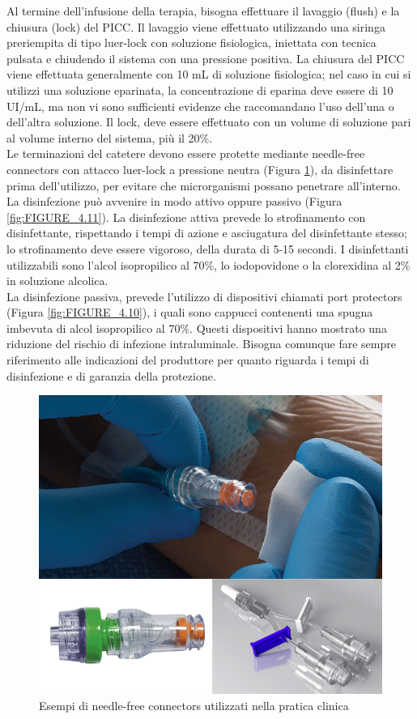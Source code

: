Al termine dell’infusione della terapia, bisogna effettuare il lavaggio (flush) e la chiusura (lock) del PICC.
Il lavaggio viene effettuato utilizzando una siringa preriempita di tipo luer-lock con soluzione fisiologica, 
iniettata con tecnica pulsata e chiudendo il sistema con una pressione positiva. La chiusura del PICC viene effettuata 
generalmente con 10 mL di soluzione fisiologica; nel caso in cui si utilizzi una soluzione eparinata, la 
concentrazione di eparina deve essere di 10 UI/mL, ma non vi sono sufficienti evidenze che raccomandano l’uso 
dell’una o dell’altra soluzione. 
Il lock, deve essere effettuato con un volume di soluzione pari al volume interno del sistema, più il 20\%.\\
Le terminazioni del catetere devono essere protette mediante needle-free connectors con attacco luer-lock a pressione 
neutra (Figura \ref{fig:FIGURE_4.9}), da disinfettare prima dell’utilizzo, per evitare che microrganismi possano penetrare 
all’interno. La disinfezione può avvenire in modo attivo oppure passivo (Figura \ref{fig:FIGURE_4.11}). 
La disinfezione attiva prevede lo strofinamento con disinfettante, rispettando i tempi di azione e asciugatura del 
disinfettante stesso; lo strofinamento deve essere vigoroso, della durata di 5-15 secondi. I disinfettanti 
utilizzabili sono l’alcol isopropilico al 70\%, lo iodopovidone o la clorexidina al 2\% in soluzione alcolica\cite{AIOMCVC}.\\
La disinfezione passiva, prevede l’utilizzo di dispositivi chiamati port protectors (Figura \ref{fig:FIGURE_4.10}), 
i quali sono cappucci contenenti una spugna imbevuta di alcol isopropilico al 70\%. 
Questi dispositivi hanno mostrato una riduzione del rischio di 
infezione intraluminale. Bisogna comunque fare sempre riferimento alle indicazioni del produttore per quanto 
riguarda i tempi di disinfezione e di garanzia della protezione\cite{AIOMCVC}.\\

\begin{figure}[H]
    \begin{center}
    \includegraphics[width=0.4\columnwidth]{img/needlefree.png}
    \end{center}
    \caption{Esempi di needle-free connectors utilizzati nella pratica clinica
    \cite{img46}}
    \label{fig:FIGURE_4.9}
\end{figure}


